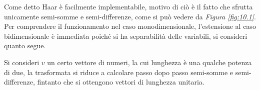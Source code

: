 \documentclass{subfiles}
\begin{document}
Come detto Haar è facilmente implementabile, motivo di ciò è il fatto che sfrutta unicamente semi-somme e semi-differenze\footnotemark[9], come si può vedere da \emph{Figura \ref{fig:10.1}}.
Per comprendere il funzionamento nel caso monodimensionale, l'estensione al caso bidimensionale è immediata poiché si ha separabilità delle variabili, si consideri quanto segue.

Si consideri \(v\) un certo vettore di numeri, la cui lunghezza è una qualche potenza di due, la trasformata si riduce a calcolare passo dopo passo semi-somme e semi-differenze\footnotemark[15],
fintanto che si ottengono vettori di lunghezza unitaria.



\end{document}
